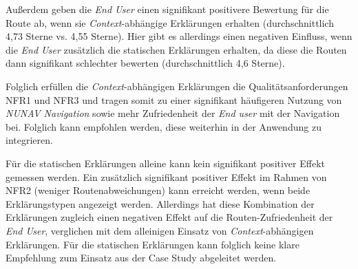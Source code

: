 Außerdem geben die \textit{End User} einen signifikant positivere Bewertung für die Route ab, wenn sie \textit{Context}-abhängige Erklärungen erhalten (durchschnittlich 4,73 Sterne vs. 4,55 Sterne). Hier gibt es allerdings einen negativen Einfluss, wenn die \textit{End User} zusätzlich die statischen Erklärungen erhalten, da diese die Routen dann signifikant schlechter bewerten (durchschnittlich 4,6 Sterne).

Folglich erfüllen die \textit{Context}-abhängigen Erklärungen die Qualitätsanforderungen NFR1 und NFR3 und tragen somit zu einer signifikant häufigeren Nutzung von \textit{NUNAV Navigation} sowie mehr Zufriedenheit der \textit{End user} mit der Navigation bei. Folglich kann empfohlen werden, diese weiterhin in der Anwendung zu integrieren.

Für die statischen Erklärungen alleine kann kein signifikant positiver Effekt gemessen werden. Ein zusätzlich signifikant positiver Effekt im Rahmen von NFR2 (weniger Routenabweichungen) kann erreicht werden, wenn beide Erklärungstypen angezeigt werden. Allerdings hat diese Kombination der Erklärungen zugleich einen negativen Effekt auf die Routen-Zufriedenheit der \textit{End User}, verglichen mit dem alleinigen Einsatz von \textit{Context}-abhängigen Erklärungen.
Für die statischen Erklärungen kann folglich keine klare Empfehlung zum Einsatz aus der Case Study abgeleitet werden.

\newpage